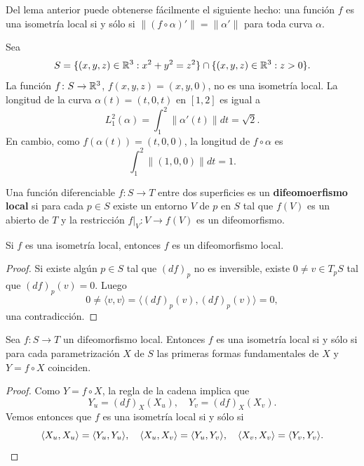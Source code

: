 Del lema anterior puede obtenerse fácilmente el siguiente hecho: una función
$f$ es una isometría local si y sólo si $\|(f\circ\alpha)'\|=\|\alpha'\|$ para
toda curva $\alpha$. 

\begin{example}
	Sea 
	\[
		S=\{(x,y,z)\in\mathbb{R}^3:x^2+y^2=z^2\}\cap\{(x,y,z)\in\mathbb{R}^3:z>0\}.
	\]
	La función $f\colon S\to\mathbb{R}^3$, $f(x,y,z)=(x,y,0)$, no es una isometría
	local. La longitud de la curva $\alpha(t)=(t,0,t)$ en $[1,2]$ es igual a
	\[
		L_1^2(\alpha)=\int_1^2\|\alpha'(t)\|dt=\sqrt{2}.
	\]
	En cambio, como $f(\alpha(t))=(t,0,0)$, la longitud de $f\circ\alpha$ es 
	\[
		\int_1^2\|(1,0,0)\|dt=1.
	\]
\end{example}

Una función diferenciable $f\colon S\to T$ entre dos superficies es un
\textbf{difeomoerfismo local} si para cada $p\in S$ existe un entorno $V$ de
$p$ en $S$ tal que $f(V)$ es un abierto de $T$ y la restricción $f|_V\colon
V\to f(V)$ es un difeomorfismo.

\begin{proposition}
	Si $f$ es una isometría local, entonces $f$ es un difeomorfismo local.
\end{proposition}

\begin{proof}
	Si existe algún $p\in S$ tal que $(df)_p$ no es inversible, existe $0\ne
	v\in T_pS$ tal que $(df)_p(v)=0$. Luego
	\[
		0\ne\langle v,v\rangle=\langle (df)_p(v),(df)_p(v)\rangle=0,
	\]
	una contradicción.
\end{proof}

\begin{lemma}
	\label{lem:isometria_local}
	Sea $f\colon S\to T$ un difeomorfismo local. Entonces 
	$f$ es una isometría local si y sólo si para cada parametrización $X$ de $S$ 
	las primeras formas fundamentales de $X$ y $Y=f\circ X$ coinciden.
\end{lemma}

\begin{proof}
	Como $Y=f\circ X$, la regla de la cadena implica que 
	\[
		Y_u = (df)_X(X_u),\quad
		Y_v = (df)_X(X_v).
	\]
	Vemos entonces que $f$ es una isometría local si y sólo si 
	\[
		\langle X_u,X_u\rangle=\langle Y_u,Y_u\rangle,
		\quad
		\langle X_u,X_v\rangle=\langle Y_u,Y_v\rangle,
		\quad
		\langle X_v,X_v\rangle=\langle Y_v,Y_v\rangle.\qedhere
	\]
\end{proof}

%	

